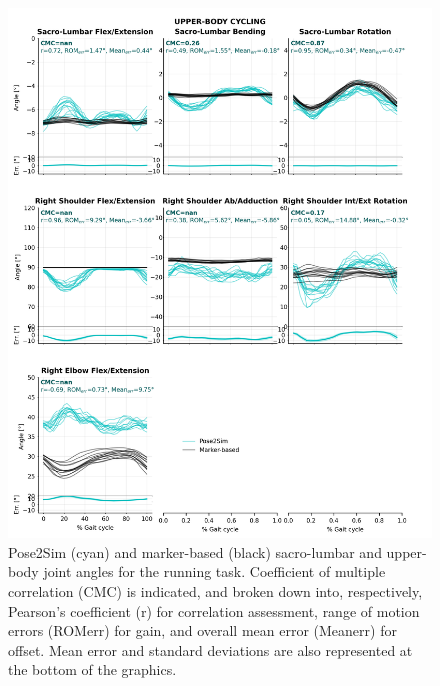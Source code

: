 \begin{figure}[!ht]
	\centering
	\def\svgwidth{1\columnwidth}
	\fontsize{10pt}{10pt}\selectfont
	\includegraphics[height=\dimexpr\textheight-119pt]{"../Annexes/Figures/Fig_QTMBikeUp.png"}
	\caption{Pose2Sim (cyan) and marker-based (black) sacro-lumbar and upper-body joint angles for the running task. Coefficient of multiple correlation (CMC) is indicated, and broken down into, respectively, Pearson’s coefficient (r) for correlation assessment, range of motion errors (ROMerr) for gain, and overall mean error (Meanerr) for offset. Mean error and standard deviations are also represented at the bottom of the graphics.}
	\label{fig_qtmrunup}
\end{figure}

